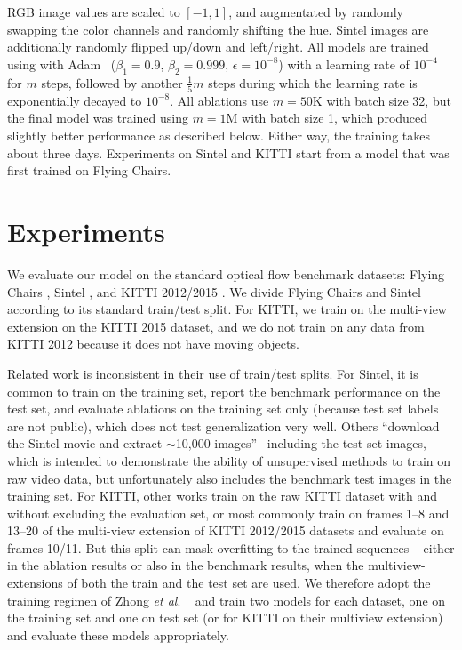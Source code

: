 \documentclass[runningheads]{llncs}
\newcommand{\etal}{\textit{et al}. }
\begin{document}
RGB image values are scaled to $[-1, 1]$, and augmentated by randomly swapping the color channels and randomly shifting the hue. Sintel images are additionally randomly flipped up/down and left/right. All models are trained using with Adam~\cite{KingmaAdam} ($\beta_1=0.9$, $\beta_2=0.999$, $\epsilon=10^{-8}$) with a learning rate of $10^{-4}$ for $m$ steps, followed by another $\frac{1}{5}m$ steps during which the learning rate is exponentially decayed to $10^{-8}$. All ablations use $m=\text{50K}$ with batch size 32, but the final model was trained using $m=\text{1M}$ with batch size 1, which produced slightly better performance as described below. Either way, the training takes about three days. Experiments on Sintel and KITTI start from a model that was first trained on Flying Chairs.
   

\section{Experiments}
\label{sec:experiments}

We evaluate our model on the standard optical flow benchmark datasets: Flying Chairs \cite{FlowNet}, Sintel \cite{ButlerECCV2012}, and KITTI 2012/2015 \cite{Geiger2012CVPR,KITTI2015}. We divide Flying Chairs and Sintel according to its standard train/test split. For KITTI, we train on the multi-view extension on the KITTI 2015 dataset, and we do not train on any data from KITTI 2012 because it does not have moving objects.

Related work is inconsistent in their use of train/test splits. For Sintel, it is common to train on the training set, report the benchmark performance on the test set, and evaluate ablations on the training set only (because test set labels are not public), which does not test generalization very well.
Others ``download the Sintel movie and extract $\sim\!$10,000 images''~\cite{SelFlow} including the test set images, which is intended to demonstrate the ability of unsupervised methods to train on raw video data, but unfortunately also includes the benchmark test images in the training set.
For KITTI, other works train on the raw KITTI dataset with and without excluding the evaluation set, or most commonly train on frames 1--8 and 13--20 of the multi-view extension of KITTI 2012/2015 datasets and evaluate on frames 10/11.
But this split can mask overfitting to the trained sequences -- either in the ablation results or also in the benchmark results, when the multiview-extensions of both the train and the test set are used. We therefore adopt the training regimen of Zhong \etal~\cite{Zhong2019UnsupervisedDE} and train two models for each dataset, one on the training set and one on test set (or for KITTI on their multiview extension) and evaluate these models appropriately.
\end{document}
